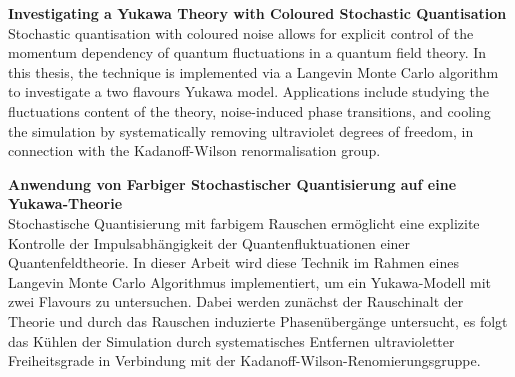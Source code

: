 \documentclass[
11pt, %
english, %
singlespacing, %
headsepline, %
]{MastersDoctoralThesis} %
\author{John \textsc{Smith}} %
\begin{document}
\frontmatter %

\pagestyle{plain} %


\pagestyle{plain} %
\vspace*{\fill}
\noindent\textbf{\large Investigating a Yukawa Theory with Coloured Stochastic Quantisation}
\vspace{20pt}\\
Stochastic quantisation with coloured noise allows for explicit control of the momentum dependency of 
quantum fluctuations in a quantum field theory.
In this thesis, the technique is implemented via a Langevin Monte Carlo algorithm to investigate a two flavours Yukawa model.
Applications include studying the fluctuations content of the theory, noise-induced phase transitions, and 
cooling the simulation by systematically removing ultraviolet degrees of freedom, in connection with the Kadanoff-Wilson renormalisation group. \par
\vspace*{\fill}
\noindent\textbf{\large Anwendung von Farbiger Stochastischer Quantisierung auf eine Yukawa-Theorie}
\vspace{20pt}\\
Stochastische Quantisierung mit farbigem Rauschen ermöglicht eine explizite Kontrolle der Impulsabhängigkeit der Quantenfluktuationen einer Quantenfeldtheorie. 
In dieser Arbeit wird diese Technik im Rahmen eines Langevin Monte Carlo Algorithmus implementiert, um ein Yukawa-Modell mit zwei Flavours zu untersuchen. 
Dabei werden zunächst der Rauschinalt der Theorie und durch das Rauschen induzierte Phasenübergänge untersucht, es folgt das Kühlen der Simulation durch systematisches Entfernen ultravioletter Freiheitsgrade in Verbindung mit der Kadanoff-Wilson-Renomierungsgruppe.
\vspace*{\fill}
\cleardoublepage

{
    \hypersetup{linkcolor=black}
    \tableofcontents
}
\end{document}
